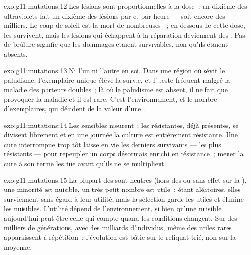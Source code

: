 \begin{solution}{exo:g11:mutations:12}
Les lésions sont proportionnelles à la dose~: un dixième des
ultraviolets fait un dixième des lésions par  et par heure ---
soit encore des milliers. Le coup de soleil est la mort de nombreuses
~; en dessous de cette dose, les  survivent, mais les
lésions qui échappent à la réparation deviennent des . Pas de
brûlure signifie que les dommages étaient survivables, non qu'ils
étaient absents.
\end{solution}

\begin{solution}{exo:g11:mutations:13}
Ni l'un ni l'autre en soi. Dans une région où sévit le paludisme,
l'exemplaire unique élève la survie, et l' reste fréquent malgré
la maladie des porteurs doubles~; là où le paludisme est absent, il ne
fait que provoquer la maladie et il est rare. C'est l'environnement, et
le nombre d'exemplaires, qui décident de la valeur d'une .
\end{solution}

\begin{solution}{exo:g11:mutations:14}
Les  sensibles meurent~; les résistantes, déjà présentes, se
divisent librement et en une journée la culture est entièrement
résistante. Une cure interrompue trop tôt laisse en vie les derniers
survivants --- les plus résistants --- pour repeupler un corps
désormais enrichi en résistance~; mener la cure à son terme les tue
avant qu'ils ne se multiplient.
\end{solution}

\begin{solution}{exo:g11:mutations:15}
La plupart des  sont neutres (hors des  ou sans effet sur
la ), une minorité est nuisible, un très petit nombre est
utile~; étant aléatoires, elles surviennent sans égard à leur utilité,
mais la sélection garde les utiles et élimine les nuisibles. L'utilité
dépend de l'environnement, si bien qu'une  nuisible aujourd'hui
peut être celle qui compte quand les conditions changent. Sur des
milliers de générations, avec des milliards d'individus, même des
 utiles rares apparaissent à répétition~: l'évolution est
bâtie sur le reliquat trié, non sur la  moyenne.
\end{solution}


